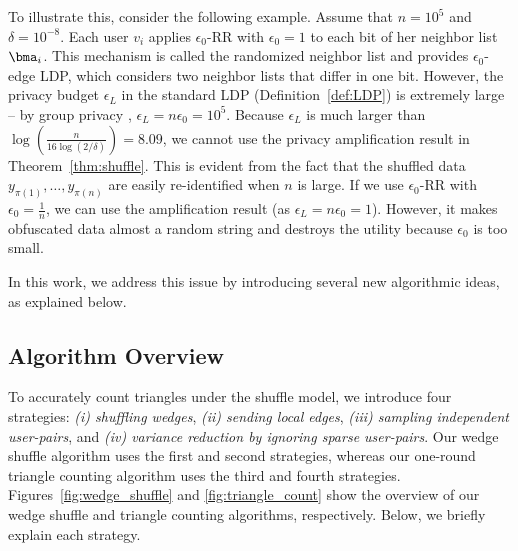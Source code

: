To illustrate this, consider the following example. 
Assume that $n=10^5$ and $\delta=10^{-8}$. 
Each user $v_i$ applies 
$\epsilon_0$-RR 
with $\epsilon_0=1$ to each bit of her neighbor list $\bma_i$. 
This mechanism is called the randomized neighbor list \cite{Qin_CCS17} and provides $\epsilon_0$-edge LDP, which considers two neighbor lists that differ in one bit. 
However, the privacy budget $\epsilon_L$ in the standard LDP (Definition~\ref{def:LDP}) 
is extremely large -- by group privacy \cite{DP}, $\epsilon_L = n \epsilon_0 = 10^5$. 
Because 
$\epsilon_L$ 
is much larger than $\log (\frac{n}{16 \log (2/\delta)}) = 8.09$, we cannot use the privacy amplification result in Theorem~\ref{thm:shuffle}. 
This is evident from the fact that the shuffled data $y_{\pi(1)}, \ldots, y_{\pi(n)}$ are easily re-identified when $n$ is large. 
If we use 
$\epsilon_0$-RR 
with $\epsilon_0 = \frac{1}{n}$, we can use the amplification result (as $\epsilon_L = n \epsilon_0 = 1$). 
However, it makes obfuscated data almost a random string and destroys the utility because $\epsilon_0$ is too small. 

In this work, we address this issue by introducing several new algorithmic ideas, as explained below. 


\subsection{Algorithm Overview}
\label{sub:triangle_overview}
To accurately count triangles under the shuffle model, 
we introduce four 
strategies: 
\textit{(i) shuffling wedges}, 
\textit{(ii) sending local edges}, 
\textit{(iii) sampling independent user-pairs}, 
and 
\textit{(iv) variance reduction by ignoring sparse user-pairs}. 
Our wedge shuffle algorithm uses the first and second strategies, whereas our one-round triangle counting algorithm uses the 
third and fourth strategies. 
Figures~\ref{fig:wedge_shuffle} and \ref{fig:triangle_count} show the overview of 
our wedge shuffle and triangle counting algorithms, respectively. 
Below, we briefly explain each strategy. 

